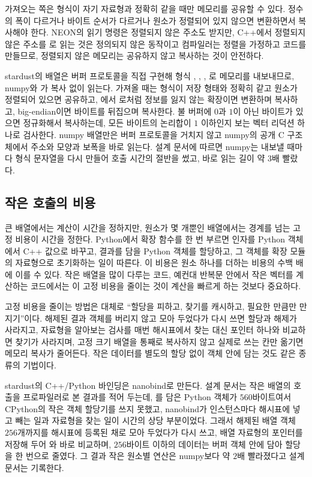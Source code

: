 가져오는 쪽은 형식이 자기 자료형과 정확히 같을 때만 메모리를 공유할 수 있다. 정수의 폭이 다르거나 바이트 순서가 다르거나 원소가 정렬되어 있지 않으면 변환하면서 복사해야 한다. NEON의 읽기 명령은 정렬되지 않은 주소도 받지만, C++에서 정렬되지 않은 주소를 로 읽는 것은 정의되지 않은 동작이고 컴파일러는 정렬을 가정하고 코드를 만들므로, 정렬되지 않은 메모리는 공유하지 않고 복사하는 것이 안전하다.

\begin{instardust}
stardust의 배열은 버퍼 프로토콜을 직접 구현해 형식 , , , 로 메모리를 내보내므로, numpy와 가 복사 없이 읽는다. 가져올 때는 형식이 저장 형태와 정확히 같고 원소가 정렬되어 있으면 공유하고, 에서 로처럼 정보를 잃지 않는 확장이면 변환하며 복사하고, big-endian이면 바이트를 뒤집으며 복사한다. 불 버퍼에 $0$과 $1$이 아닌 바이트가 있으면 정규화해서 복사하는데, 모든 바이트의 논리합이 $1$ 이하인지 보는 벡터 리덕션 하나로 검사한다. numpy 배열만은 버퍼 프로토콜을 거치지 않고 numpy의 공개 C 구조체에서 주소와 모양과 보폭을 바로 읽는다. 설계 문서에 따르면 numpy는 내보낼 때마다 형식 문자열을 다시 만들어 호출 시간의 절반을 썼고, 바로 읽는 길이 약 $3$배 빨랐다.
\end{instardust}

\subsection{작은 호출의 비용}

큰 배열에서는 계산이 시간을 정하지만, 원소가 몇 개뿐인 배열에서는 경계를 넘는 고정 비용이 시간을 정한다. Python에서 확장 함수를 한 번 부르면 인자를 Python 객체에서 C++ 값으로 바꾸고, 결과를 담을 Python 객체를 할당하고, 그 객체를 확장 모듈의 자료형으로 초기화하는 일이 따른다. 이 비용은 원소 하나를 더하는 비용의 수백 배에 이를 수 있다. 작은 배열을 많이 다루는 코드, 예컨대 반복문 안에서 작은 벡터를 계산하는 코드에서는 이 고정 비용을 줄이는 것이 계산을 빠르게 하는 것보다 중요하다.

고정 비용을 줄이는 방법은 대체로 ``할당을 피하고, 찾기를 캐시하고, 필요한 만큼만 만지기''이다. 해제된 결과 객체를 버리지 않고 모아 두었다가 다시 쓰면 할당과 해제가 사라지고, 자료형을 알아보는 검사를 매번 해시표에서 찾는 대신 포인터 하나와 비교하면 찾기가 사라지며, 고정 크기 배열을 통째로 복사하지 않고 실제로 쓰는 칸만 옮기면 메모리 복사가 줄어든다. 작은 데이터를 별도의 할당 없이 객체 안에 담는 것도 같은 종류의 기법이다.

\begin{instardust}
stardust의 C++/Python 바인딩은 nanobind로 만든다\cite{nanobind}. 설계 문서는 작은 배열의 호출을 프로파일러로 본 결과를 적어 두는데, 를 담은 Python 객체가 $560$바이트여서 CPython의 작은 객체 할당기를 쓰지 못했고, nanobind가 인스턴스마다 해시표에 넣고 빼는 일과 자료형을 찾는 일이 시간의 상당 부분이었다. 그래서 해제된 배열 객체 $256$개까지를 해시표에 등록된 채로 모아 두었다가 다시 쓰고, 배열 자료형의 포인터를 저장해 두어 와 바로 비교하며, $256$바이트 이하의 데이터는 버퍼 객체 안에 담아 할당을 한 번으로 줄였다. 그 결과 작은 원소별 연산은 numpy보다 약 $2$배 빨라졌다고 설계 문서는 기록한다.
\end{instardust}

